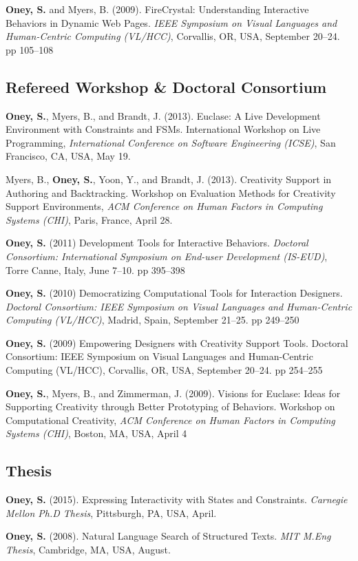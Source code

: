  {
\textbf{Oney, S.} and Myers, B. (2009). FireCrystal: Understanding Interactive Behaviors in Dynamic Web Pages. \textit{IEEE Symposium on Visual Languages and Human-Centric Computing (VL/HCC)}, Corvallis, OR, USA, September 20--24. pp 105--108
}

\subsection{Refereed Workshop \& Doctoral Consortium}

 {
\textbf{Oney, S.}, Myers, B., and Brandt, J. (2013). Euclase: A Live Development Environment with Constraints and FSMs. International Workshop on Live Programming, \textit{International Conference on Software Engineering (ICSE)}, San Francisco, CA, USA, May 19.
}

 {
Myers, B., \textbf{Oney, S.}, Yoon, Y., and Brandt, J. (2013). Creativity Support in Authoring and Backtracking. Workshop on Evaluation Methods for Creativity Support Environments, \textit{ACM Conference on Human Factors in Computing Systems (CHI)}, Paris, France, April 28.
}

 {
\textbf{Oney, S.} (2011) Development Tools for Interactive Behaviors. \textit{Doctoral Consortium: International Symposium on End-user Development (IS-EUD)}, Torre Canne, Italy, June 7--10. pp 395--398
}

 {
\textbf{Oney, S.} (2010) Democratizing Computational Tools for Interaction Designers. \textit{Doctoral Consortium: IEEE Symposium on Visual Languages and Human-Centric Computing (VL/HCC)}, Madrid, Spain, September 21--25. pp 249--250
}

 {
\textbf{Oney, S.} (2009) Empowering Designers with Creativity Support Tools. Doctoral Consortium: IEEE Symposium on Visual Languages and Human-Centric Computing (VL/HCC), Corvallis, OR, USA, September 20--24. pp 254--255
}

 {
\textbf{Oney, S.}, Myers, B., and Zimmerman, J. (2009). Visions for Euclase: Ideas for Supporting Creativity through Better Prototyping of Behaviors. Workshop on Computational Creativity, \textit{ACM Conference on Human Factors in Computing Systems (CHI)}, Boston, MA, USA, April 4
}

\subsection{Thesis}

 {
\textbf{Oney, S.} (2015). Expressing Interactivity with States and Constraints. \textit{Carnegie Mellon Ph.D Thesis}, Pittsburgh, PA, USA, April.
}

 {
\textbf{Oney, S.} (2008). Natural Language Search of Structured Texts. \textit{MIT M.Eng Thesis}, Cambridge, MA, USA, August.
}
